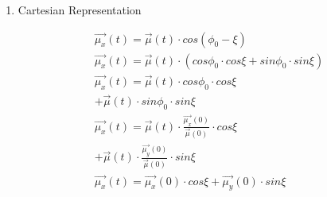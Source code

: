 \begin{enumerate}
\begin{multicols}{2}
    \begin{figure}[H]
        \centering
        \texttt{[image: fig25]}
        \caption{ Clockwise precession of a proton's spin about a magnetic field.
        } 
        \label{fig:fig25}
    \end{figure}

    \end{multicols}

    \begin{equation}\label{eq:eq225}
        \abs{d\vec{\mu}} = \mu\, sin\theta\, \abs{d\phi}
    \end{equation}
    From Eq~\ref{eq:eq224}:
    \begin{equation}\label{eq:eq226}
        \abs{d\vec{\mu}} = \gamma \abs{\vec{\mu} \times \vec{B}} dt = \gamma\, \mu\, B\, sin \theta\, dt
    \end{equation}
    From Eq~\ref{eq:eq225} and ~\ref{eq:eq226} we have: $\abs{d\phi} = \gamma\, B\,dt$.\\
    Because $\omega = \abs{\frac{d\phi}{dt}}$, we get the famous Larmor precession formula:
    \begin{equation}\label{eq:eq227}
        \omega = \gamma\, B
    \end{equation}
    Also, because we have a clockwise rotation in the figure:
    \begin{equation}\label{eq:eq228}
        \frac{d\phi}{dt} = - \omega
    \end{equation}
    If the field is along the z-axis and constant in time, $\vec{B} = B_0 \hat{z}$,
    the solution for Eq~\ref{eq:eq228} is:
    \begin{equation}\label{eq:eq230}
        \phi = - \omega_0 t + \phi_0
    \end{equation}

    \item Cartesian Representation
    \begin{multicols}{2}
    \begin{align*}
        \vec{\mu_x}(t) = \vec{\mu}(t) \cdot cos(\phi_0 - \xi) \\
        \vec{\mu_x}(t) = \vec{\mu}(t) \cdot (cos \phi_0 \cdot cos \xi + sin \phi_0 \cdot sin \xi ) \\
        \vec{\mu_x}(t) = \vec{\mu}(t) \cdot cos \phi_0 \cdot cos \xi \\
        + \vec{\mu}(t) \cdot sin \phi_0 \cdot sin \xi  \\
        \vec{\mu_x}(t) = \vec{\mu}(t) \cdot \frac{\vec{\mu_x}(0)}{\vec{\mu}(0)} \cdot cos \xi \\
        + \vec{\mu}(t) \cdot  \frac{\vec{\mu_y}(0)}{\vec{\mu}(0)} \cdot sin \xi  \\
        \vec{\mu_x}(t) = \vec{\mu_x}(0) \cdot cos \xi + \vec{\mu_y}(0) \cdot sin \xi \\
    \end{align*}


\end{multicols}
\end{enumerate}
